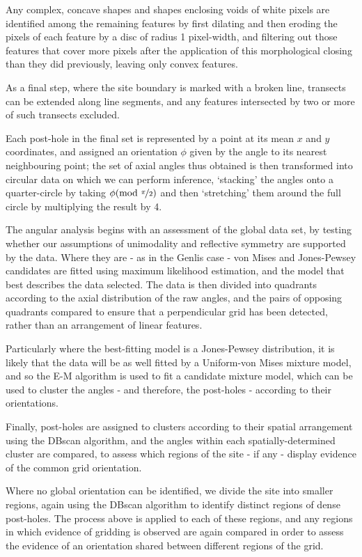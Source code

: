 \documentclass[../../ArchStats.tex]{subfiles}
\begin{document}
Any complex, concave shapes and shapes enclosing voids of white pixels are identified among the remaining features by first dilating and then eroding the pixels of each feature by a disc of radius 1 pixel-width, and filtering out those features that cover more pixels after the application of this morphological closing than they did previously, leaving only convex features.

As a final step, where the site boundary is marked with a broken line, transects can be extended along line segments, and any features intersected by two or more of such  transects excluded.

Each post-hole in the final set is represented by a point at its mean $x$ and $y$ coordinates, and assigned an orientation $\phi$ given by the angle to its nearest neighbouring point; the set of axial angles thus obtained is then transformed into  circular data on which we can perform inference, `stacking' the angles onto a quarter-circle by taking $\phi (\text{mod }\nicefrac{\pi}{2})$ and then `stretching' them around the full circle by multiplying the result by 4.

The angular analysis begins with an assessment of the global data set, by testing whether our assumptions of unimodality and reflective symmetry are supported by the data. Where they are - as in the Genlis case - von Mises and Jones-Pewsey candidates are fitted using maximum likelihood estimation, and the model that best describes the data selected. The data is then divided into quadrants according to the axial distribution of the raw angles, and the pairs of opposing quadrants compared to ensure that a perpendicular grid has been detected, rather than an arrangement of linear features.

Particularly where the best-fitting model is a Jones-Pewsey distribution, it is likely that the data will be as well fitted by a Uniform-von Mises mixture model, and so the E-M algorithm is used to fit a candidate mixture model, which can be used to cluster the angles - and therefore, the post-holes - according to their orientations.

Finally, post-holes are assigned to clusters according to their spatial arrangement using the DBscan algorithm, and the angles within each spatially-determined cluster are compared, to assess which regions of the site - if any - display evidence of the common grid orientation.

Where no global orientation can be identified, we divide the site into smaller regions, again using the DBscan algorithm to identify distinct regions of dense post-holes. The process above is applied to each of these regions, and any regions in which  evidence of gridding is observed are again compared in order to assess the evidence of an orientation shared between different regions of the grid.
\end{document}
